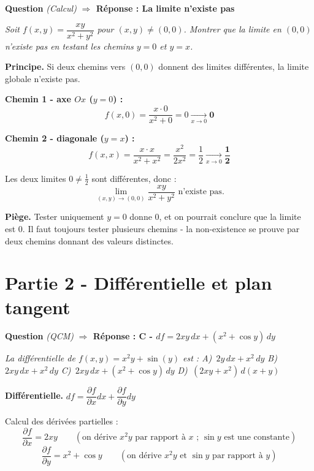 \documentclass[11pt,a4paper]{article}
\newcounter{qnum}
\newcommand{\qtitre}[2]{%
  \stepcounter{qnum}%
  \medskip\noindent
  \textbf{\color{bleutexte}Question \theqnum}\enspace
  \textit{(#1)}\enspace
  \textcolor{vertok}{\textbf{$\Rightarrow$ Réponse : #2}}
  \par\smallskip
}
\newcommand{\qenonce}[1]{%
  \begin{mdframed}[backgroundcolor=grisbox, linewidth=0pt,
    innerleftmargin=8pt, innerrightmargin=8pt,
    innertopmargin=5pt, innerbottommargin=5pt,
    skipabove=2pt, skipbelow=4pt]
  \small\textit{#1}
  \end{mdframed}
}
\begin{document}
\qtitre{Calcul}{La limite n'existe pas}
\qenonce{Soit $f(x,y) = \dfrac{xy}{x^2+y^2}$ pour $(x,y)\neq(0,0)$. Montrer que la limite en $(0,0)$ n'existe pas en testant les chemins $y=0$ et $y=x$.}

\begin{reponsebox}
\textbf{Principe.} Si deux chemins vers $(0,0)$ donnent des limites différentes, la limite globale n'existe pas.

\textbf{Chemin 1 - axe $Ox$ ($y = 0$) :}
$$f(x, 0) = \frac{x \cdot 0}{x^2 + 0} = 0 \xrightarrow[x\to 0]{} \mathbf{0}$$

\textbf{Chemin 2 - diagonale ($y = x$) :}
$$f(x, x) = \frac{x \cdot x}{x^2 + x^2} = \frac{x^2}{2x^2} = \frac{1}{2} \xrightarrow[x\to 0]{} \mathbf{\dfrac{1}{2}}$$

Les deux limites $0 \neq \tfrac{1}{2}$ sont différentes, donc :
$$\boxed{\lim_{(x,y)\to(0,0)}\frac{xy}{x^2+y^2} \text{ n'existe pas.}}$$
\end{reponsebox}

\begin{piegebox}
\textbf{Piège.} Tester uniquement $y=0$ donne 0, et on pourrait conclure que la limite est 0. Il faut toujours tester plusieurs chemins - la non-existence se prouve par deux chemins donnant des valeurs distinctes.
\end{piegebox}

\section{Partie 2 - Différentielle et plan tangent}

\qtitre{QCM}{C - $df = 2xy\,dx + (x^2+\cos y)\,dy$}
\qenonce{La différentielle de $f(x,y) = x^2 y + \sin(y)$ est :
\quad A)~$2y\,dx + x^2\,dy$
\quad B)~$2xy\,dx + x^2\,dy$
\quad C)~$2xy\,dx + (x^2+\cos y)\,dy$
\quad D)~$(2xy+x^2)\,d(x+y)$}

\begin{methodebox}
\textbf{Différentielle.} $df = \dfrac{\partial f}{\partial x}dx + \dfrac{\partial f}{\partial y}dy$
\end{methodebox}

Calcul des dérivées partielles :
$$\frac{\partial f}{\partial x} = 2xy \qquad (\text{on dérive } x^2y \text{ par rapport à } x \text{ ; }\sin y \text{ est une constante})$$
$$\frac{\partial f}{\partial y} = x^2 + \cos y \qquad (\text{on dérive } x^2y \text{ et } \sin y \text{ par rapport à } y)$$
\end{document}
